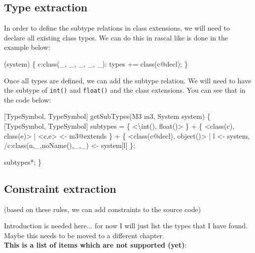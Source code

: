 \documentclass[../main.tex]{subfiles}
\begin{document}
    \subsection{Type extraction}
    In order to define the subtype relations in class extensions, we will need to declare all existing class types.
    We can do this in rascal like is done in the example below:
    \begin{rascal}
 (system) \{{}
     c:class(\_{}, \_{}, \_{}, \_{}, \_{}): types += class(c@decl);
\}{}
    \end{rascal}
    Once all types are defined, we can add the subtype relation. We will need to have the subtype of \texttt{int()} and \texttt{float()} and the class extensions.
    You can see that in the code below:
    \begin{rascal}
 [TypeSymbol, TypeSymbol] getSubTypes(M3 m3, System system) 
\{{}
    [TypeSymbol, TypeSymbol] subtypes
        = \{{} \textless{}\textbackslash{}int(), float()\textgreater{} \}{} 
        + \{{} \textless{}class(c), class(e)\textgreater{} | \textless{}c,e\textgreater{} \textless{}- m3@extends \}{}
        + \{{} \textless{}class(c@decl), object()\textgreater{} | l \textless{}- system, /c:class(n,\_{},noName(),\_{},\_{}) \textless{}- system{}[l] \}{};
        
     subtypes*;        
\}{}
    \end{rascal}
  
    \subsection{Constraint extraction}
    (based on these rules, we can add constraints to the source code)
       
    Introduction is needed here... for now I will just list the types that I have found.
    Maybe this needs to be moved to a different chapter.
    \\
    \textbf{This is a list of items which are not supported (yet)}:
\end{document}
